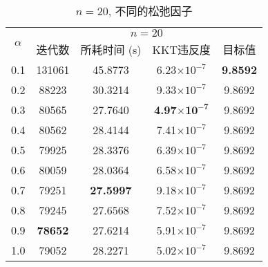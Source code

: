 \begin{table}[htbp]
	\renewcommand{\captionfont}{\small}
    \centering
    \caption{$n=20$, 不同的松弛因子}
    \label{n20alpha}
    \vskip 4mm
    \begin{tabular}{c|c|c|c|c}
        \hline
        \multirow{2}{*}{$\alpha$} & \multicolumn{4}{c}{$n=20$}\\\cline{2-5}
          & 迭代数 & 所耗时间 (s) & KKT违反度 & 目标值\\\hline
        0.1 & 131061 & 45.8773 & 6.23$\times10^{-7}$ & \textbf{9.8592} \\\hline
        0.2 & 88223 & 30.3214 & 9.33$\times10^{-7}$ & 9.8692 \\\hline
        0.3 & 80565 & 27.7640 & \textbf{4.97$\mathbf{\times10^{-7}}$} & 9.8692 \\\hline
        0.4 & 80562 & 28.4144 & 7.41$\times10^{-7}$ & 9.8692 \\\hline
        0.5 & 79925 & 28.3376 & 6.39$\times10^{-7}$ & 9.8692 \\\hline
        0.6 & 80059 & 28.0364 & 6.58$\times10^{-7}$ & 9.8692 \\\hline
        0.7 & 79251 & \textbf{27.5997} & 9.18$\times10^{-7}$ & 9.8692 \\\hline
        0.8 & 79245 & 27.6568 & 7.52$\times10^{-7}$ & 9.8692 \\\hline
        0.9 & \textbf{78652} & 27.6214 & 5.91$\times10^{-7}$ & 9.8692 \\\hline
        1.0 & 79052 & 28.2271 & 5.02$\times10^{-7}$ & 9.8692 \\\hline
    \end{tabular}
\end{table}

